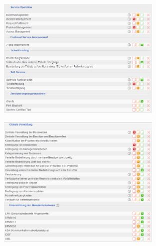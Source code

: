 \documentclass[12pt]{article}
\begin{document}
\noindent
\begin{figure}[here!]
\centering
\includegraphics[width=0.7\textwidth]{images/tr39}
\end{figure}\FloatBarrier
\noindent
\begin{figure}[here!]
\centering
\includegraphics[width=0.7\textwidth]{images/tr40}
\end{figure}\FloatBarrier
\noindent
\end{document}

